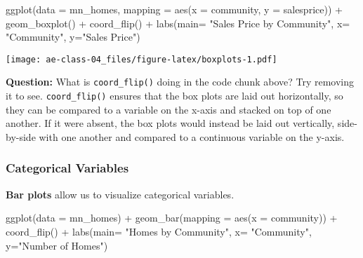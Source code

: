 \documentclass[
]{article}
\newenvironment{Shaded}{\begin{snugshade}}{\end{snugshade}}
\newcommand{\AttributeTok}[1]{\textcolor[rgb]{0.77,0.63,0.00}{#1}}
\newcommand{\FunctionTok}[1]{\textcolor[rgb]{0.00,0.00,0.00}{#1}}
\newcommand{\NormalTok}[1]{#1}
\newcommand{\SpecialCharTok}[1]{\textcolor[rgb]{0.00,0.00,0.00}{#1}}
\newcommand{\StringTok}[1]{\textcolor[rgb]{0.31,0.60,0.02}{#1}}
\begin{document}
\begin{Shaded}
\begin{Highlighting}[]
\FunctionTok{ggplot}\NormalTok{(}\AttributeTok{data =}\NormalTok{ mn\_homes, }
       \AttributeTok{mapping =} \FunctionTok{aes}\NormalTok{(}\AttributeTok{x =}\NormalTok{ community, }\AttributeTok{y =}\NormalTok{ salesprice)) }\SpecialCharTok{+} 
       \FunctionTok{geom\_boxplot}\NormalTok{() }\SpecialCharTok{+} \FunctionTok{coord\_flip}\NormalTok{() }\SpecialCharTok{+} 
       \FunctionTok{labs}\NormalTok{(}\AttributeTok{main=} \StringTok{"Sales Price by Community"}\NormalTok{, }\AttributeTok{x=} \StringTok{"Community"}\NormalTok{, }\AttributeTok{y=}\StringTok{"Sales Price"}\NormalTok{)}
\end{Highlighting}
\end{Shaded}

\texttt{[image: ae-class-04\_files/figure-latex/boxplots-1.pdf]}

\textbf{Question:} What is \texttt{coord\_flip()} doing in the code
chunk above? Try removing it to see. \texttt{coord\_flip()} ensures that
the box plots are laid out horizontally, so they can be compared to a
variable on the x-axis and stacked on top of one another. If it were
absent, the box plots would instead be laid out vertically, side-by-side
with one another and compared to a continuous variable on the y-axis.

\hypertarget{categorical-variables}{%
\subsubsection{Categorical Variables}\label{categorical-variables}}

\textbf{Bar plots} allow us to visualize categorical variables.

\begin{Shaded}
\begin{Highlighting}[]
\FunctionTok{ggplot}\NormalTok{(}\AttributeTok{data =}\NormalTok{ mn\_homes) }\SpecialCharTok{+} 
  \FunctionTok{geom\_bar}\NormalTok{(}\AttributeTok{mapping =} \FunctionTok{aes}\NormalTok{(}\AttributeTok{x =}\NormalTok{ community)) }\SpecialCharTok{+} \FunctionTok{coord\_flip}\NormalTok{() }\SpecialCharTok{+} 
  \FunctionTok{labs}\NormalTok{(}\AttributeTok{main=} \StringTok{"Homes by Community"}\NormalTok{, }\AttributeTok{x=} \StringTok{"Community"}\NormalTok{, }\AttributeTok{y=}\StringTok{"Number of Homes"}\NormalTok{)}
\end{Highlighting}
\end{Shaded}
\end{document}
